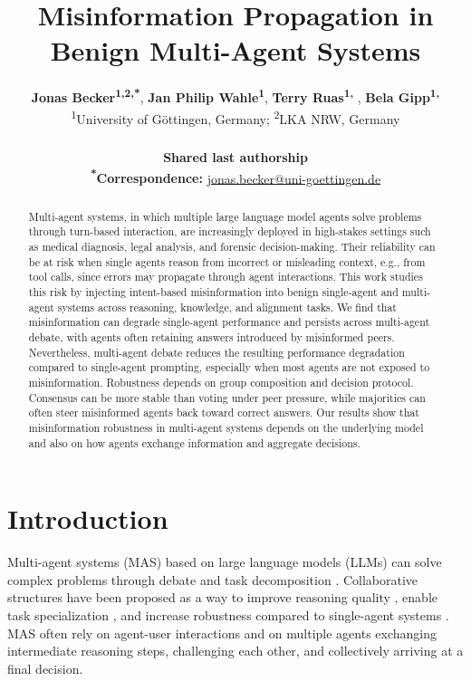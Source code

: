 \documentclass[11pt]{article}
\title{Misinformation Propagation in Benign Multi-Agent Systems}
\author{
 \textbf{Jonas Becker\textsuperscript{1,2,*}},
 \textbf{Jan Philip Wahle\textsuperscript{1}},
 \textbf{Terry Ruas\textsuperscript{1, \dag}},
 \textbf{Bela Gipp\textsuperscript{1, \dag}}
\\
 \textsuperscript{1}University of Göttingen, Germany; \textsuperscript{2}LKA NRW, Germany
\\
\\
    \small{\textbf{\textsuperscript{\dag}Shared last authorship}} \\
    \small{\textbf{\textsuperscript{*}Correspondence:} \href{mailto:jonas.becker@uni-goettingen.de}{jonas.becker@uni-goettingen.de}}
}
\begin{document}
\maketitle
\AddAnnotationRef{}

\begin{abstract}
Multi-agent systems, in which multiple large language model agents solve problems through turn-based interaction, are increasingly deployed in high-stakes settings such as medical diagnosis, legal analysis, and forensic decision-making.
Their reliability can be at risk when single agents reason from incorrect or misleading context, e.g., from tool calls, since errors may propagate through agent interactions.
This work studies this risk by injecting intent-based misinformation into benign single-agent and multi-agent systems across reasoning, knowledge, and alignment tasks.
We find that misinformation can degrade single-agent performance and persists across multi-agent debate, with agents often retaining answers introduced by misinformed peers.
Nevertheless, multi-agent debate reduces the resulting performance degradation compared to single-agent prompting, especially when most agents are not exposed to misinformation.
Robustness depends on group composition and decision protocol. Consensus can be more stable than voting under peer pressure, while majorities can often steer misinformed agents back toward correct answers.
Our results show that misinformation robustness in multi-agent systems depends on the underlying model and also on how agents exchange information and aggregate decisions.
\end{abstract}

\section{Introduction}

Multi-agent systems (MAS) based on large language models (LLMs) can solve complex problems through debate and task decomposition \citep{rasal2024llmharmonymultiagentcommunication, li2024survey, SAPKOTA2026103599}. 
Collaborative structures have been proposed as a way to improve reasoning quality \citep{wang-etal-2024-rethinking-bounds, 10.5555/3692070.3692537}, enable task specialization \citep{borghoff2025organizational}, and increase robustness compared to single-agent systems \citep{ju2025disagreementselicitrobustnessinvestigating, staufer20262025aiagentindex}.
MAS often rely on agent-user interactions and on multiple agents exchanging intermediate reasoning steps, challenging each other, and collectively arriving at a final decision. 
\end{document}
